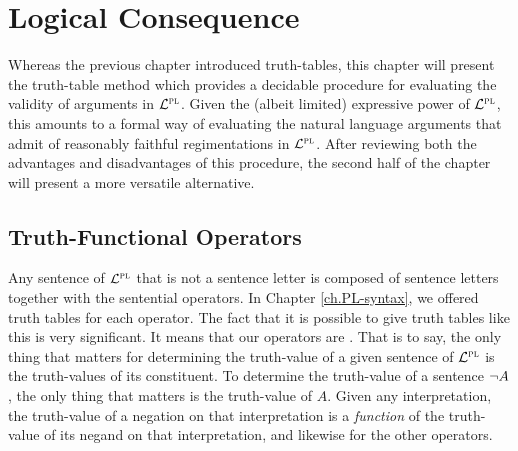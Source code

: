 \chapter{Logical Consequence}
\label{ch.PL-semantics}

Whereas the previous chapter introduced truth-tables, this chapter will present the truth-table method which provides a decidable procedure for evaluating the validity of arguments in $\mathcal{L}^{\textsc{pl}}$.
Given the (albeit limited) expressive power of $\mathcal{L}^{\textsc{pl}}$, this amounts to a formal way of evaluating the natural language arguments that admit of reasonably faithful regimentations in $\mathcal{L}^{\textsc{pl}}$.
After reviewing both the advantages and disadvantages of this procedure, the second half of the chapter will present a more versatile alternative.




\section{Truth-Functional Operators}

Any sentence of $\mathcal{L}^{\textsc{pl}}$ that is not a sentence letter is composed of sentence letters together with the sentential operators.
In Chapter \ref{ch.PL-syntax}, we offered truth tables for each operator.
The fact that it is possible to give truth tables like this is very significant.
It means that our operators are .
That is to say, the only thing that matters for determining the truth-value of a given sentence of $\mathcal{L}^{\textsc{pl}}$ is the truth-values of its constituent.
To determine the truth-value of a sentence $\neg A$, the only thing that matters is the truth-value of $A$.
Given any interpretation, the truth-value of a negation on that interpretation is a \textit{function} of the truth-value of its negand on that interpretation, and likewise for the other operators.


